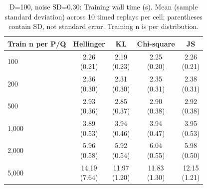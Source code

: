 \begin{table}[t]
\centering
\small
\setlength{\tabcolsep}{4pt}
\caption{D=100, noise SD=0.30: Training wall time (s). Mean (sample standard deviation) across 10 timed replays per cell; parentheses contain SD, not standard error. Training n is per distribution.}
\label{tab:sim-d-100-noise-sd-0-30-training-wall-time-s}
\begin{tabular}{lcccc}
\toprule
Train n per P/Q & Hellinger & KL & Chi-square & JS \\
\midrule
100 & \shortstack{2.26\\(0.21)} & \shortstack{2.19\\(0.23)} & \shortstack{2.25\\(0.20)} & \shortstack{2.26\\(0.21)} \\
200 & \shortstack{2.36\\(0.30)} & \shortstack{2.31\\(0.30)} & \shortstack{2.35\\(0.31)} & \shortstack{2.38\\(0.31)} \\
500 & \shortstack{2.93\\(0.36)} & \shortstack{2.85\\(0.37)} & \shortstack{2.90\\(0.38)} & \shortstack{2.92\\(0.38)} \\
1,000 & \shortstack{3.89\\(0.53)} & \shortstack{3.94\\(0.46)} & \shortstack{3.94\\(0.47)} & \shortstack{3.95\\(0.53)} \\
2,000 & \shortstack{5.96\\(0.58)} & \shortstack{5.92\\(0.54)} & \shortstack{6.04\\(0.55)} & \shortstack{5.98\\(0.50)} \\
5,000 & \shortstack{14.19\\(7.64)} & \shortstack{11.97\\(1.20)} & \shortstack{11.83\\(1.30)} & \shortstack{12.15\\(1.21)} \\
\bottomrule
\end{tabular}
\end{table}
